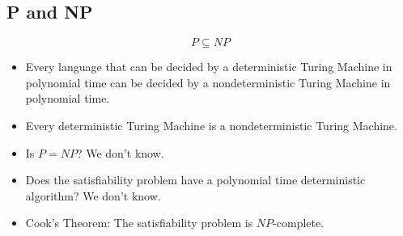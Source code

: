 \documentclass[letter]{article}
\begin{document}
\begin{multicols}{2}
	\section{P and NP}
	$$P \subseteq NP$$
	\begin{itemize}
		\item Every language that can be decided by a deterministic Turing
					Machine in polynomial time can be decided by a nondeterministic
					Turing Machine in polynomial time.
		\item Every deterministic Turing Machine is a nondeterministic Turing
					Machine.
		\item Is $P = NP$? We don't know.
		\item Does the satisfiability problem have a polynomial time deterministic
					algorithm? We don't know.
		\item Cook's Theorem: The satisfiability problem is $NP$-complete.
	\end{itemize}

\end{multicols}
\end{document}
